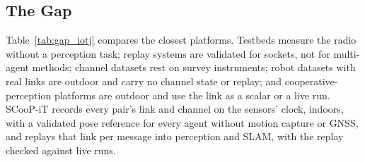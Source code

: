 \subsection{The Gap}
Table~\ref{tab:gap_iotj} compares the closest platforms. Testbeds
measure the radio without a perception task; replay systems are
validated for sockets, not for multi-agent methods; channel datasets
rest on survey instruments; robot datasets with real links are outdoor
and carry no channel state or replay; and cooperative-perception
platforms are outdoor and use the link as a scalar or a live run.
SCooP-iT records every pair's link and channel on the sensors' clock,
indoors, with a validated pose reference for every agent without motion
capture or GNSS, and replays that link per message into perception and
SLAM, with the replay checked against live runs.


